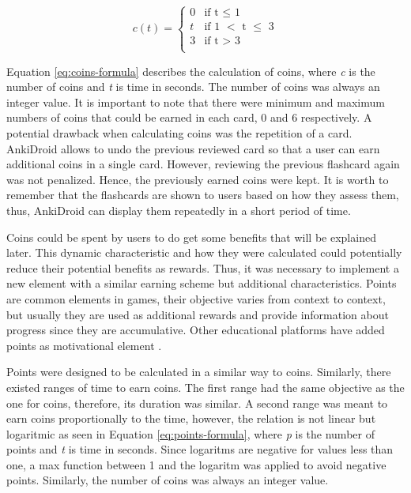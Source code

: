 \begin{equation}
  c(t) =
      \begin{cases}
        0 & \text{if t $\leq$ 1}\\
        t & \text{if 1 $<$ t $\leq$ 3}\\
        3 & \text{if t $>$ 3}\\
      \end{cases}
    \label{eq:coins-formula}
\end{equation}

Equation \ref{eq:coins-formula} describes the calculation of coins, where \textit{c} is the number of coins and \textit{t} is time in seconds. The number of coins was always an integer value. It is important to note that there were minimum and maximum numbers of coins that could be earned in each card, 0 and 6 respectively. A potential drawback when calculating coins was the repetition of a card. AnkiDroid allows to undo the previous reviewed card so that a user can earn additional coins in a single card. However, reviewing the previous flashcard again was not penalized. Hence, the previously earned coins were kept. It is worth to remember that the flashcards are shown to users based on how they assess them, thus, AnkiDroid can display them repeatedly in a short period of time.

Coins could be spent by users to do get some benefits that will be explained later. This dynamic characteristic and how they were calculated could potentially reduce their potential benefits as rewards. Thus, it was necessary to implement a new element with a similar earning scheme but additional characteristics. Points are common elements in games, their objective varies from context to context, but usually they are used as additional rewards and provide information about progress since they are accumulative. Other educational platforms have added points as motivational element \citep{disalvo2014khan}.

Points were designed to be calculated in a similar way to coins. Similarly, there existed ranges of time to earn coins. The first range had the same objective as the one for coins, therefore, its duration was similar. A second range was meant to earn coins proportionally to the time, however, the relation is not linear but logaritmic as seen in Equation \ref{eq:points-formula}, where \textit{p} is the number of points and \textit{t} is time in seconds. Since logaritms are negative for values less than one, a max function between 1 and the logaritm was applied to avoid negative points. Similarly, the number of coins was always an integer value.

